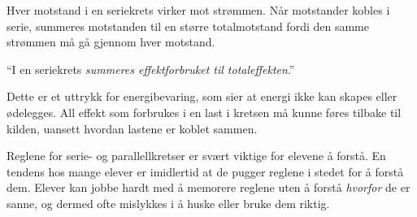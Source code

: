 Hver motstand i en seriekrets virker mot strømmen.  Når motstander kobles i serie, summeres motstanden til en større totalmotstand fordi den samme strømmen må gå gjennom hver motstand.



\vskip 30pt

\noindent
``I en seriekrets {\it summeres effektforbruket til totaleffekten}.''

\vskip 10pt

Dette er et uttrykk for energibevaring, som sier at energi ikke kan skapes eller ødelegges.  All effekt som forbrukes i en last i kretsen må kunne føres tilbake til kilden, uansett hvordan lastene er koblet sammen.







Reglene for serie- og parallellkretser er svært viktige for elevene å forstå.  En tendens hos mange elever er imidlertid at de pugger reglene i stedet for å forstå dem.  Elever kan jobbe hardt med å memorere reglene uten å forstå {\it hvorfor} de er sanne, og dermed ofte mislykkes i å huske eller bruke dem riktig.



